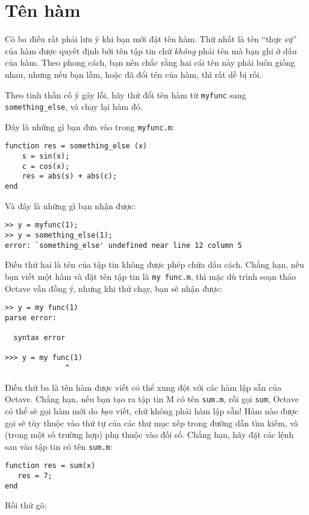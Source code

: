 \documentclass[12pt]{book}
\begin{document}
\section{Tên hàm}

Có ba điều rất phải lưu ý khi bạn mới đặt tên hàm. Thứ nhất là tên 
``thực sự'' của hàm được quyết định bởi tên tập tin chứ {\em không}
phải tên mà bạn ghi ở dấu của hàm. Theo phong cách, bạn nên
chắc rằng hai cái tên này phải luôn giống nhau, nhưng nếu bạn
lầm, hoặc đã đổi tên của hàm, thì rất dễ bị rối.

Theo tinh thần cố ý gây lỗi, hãy thử đổi tên hàm từ
{\tt myfunc} sang \verb#something_else#, và chạy lại hàm đó.

Đây là những gì bạn đưa vào trong {\tt myfunc.m}:

\begin{verbatim}
function res = something_else (x)
    s = sin(x);
    c = cos(x);
    res = abs(s) + abs(c);
end
\end{verbatim}
%
Và đây là những gì bạn nhận được:

\begin{verbatim}
>> y = myfunc(1);
>> y = something_else(1);
error: `something_else' undefined near line 12 column 5
\end{verbatim}

Điều thứ hai là tên của tập tin không được phép chứa dấu cách.
Chẳng hạn, nếu bạn viết một hàm và đặt tên tập tin là {\tt my func.m},
thì mặc dù trình soạn thảo Octave vẫn đồng ý, nhưng khi thử chạy,
bạn sẽ nhận được:

\begin{verbatim}
>> y = my func(1)
parse error:

  syntax error

>>> y = my func(1)
              ^
\end{verbatim}

Điều thứ ba là tên hàm được viết có thể xung đột với các hàm lập sẵn
của Octave. Chẳng hạn, nếu bạn tạo ra tập tin M có tên {\tt sum.m}, 
rồi gọi {\tt sum}, Octave có thể sẽ gọi hàm mới do {\em bạn} viết,
chứ không phải hàm lập sẵn! Hàm nào được gọi sẽ tùy thuộc vào thứ tự
của các thư mục xếp trong đường dẫn tìm kiếm, và (trong một số
trường hợp) phụ thuộc vào đối số. Chẳng hạn, hãy đặt các lệnh sau
vào tập tin có tên {\tt sum.m}:

\begin{verbatim}
function res = sum(x)
   res = 7;
end
\end{verbatim}

Rồi thử gõ:
\end{document}
